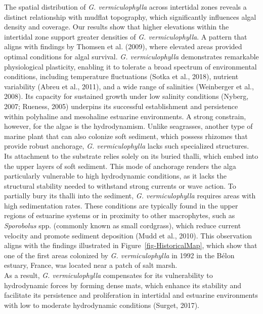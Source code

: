\documentclass[
  letterpaper,
  DIV=11,
  numbers=noendperiod]{scrartcl}
\begin{document}
The spatial distribution of \emph{G. vermiculophylla} across intertidal
zones reveals a distinct relationship with mudflat topography, which
significantly influences algal density and coverage. Our results show
that higher elevations within the intertidal zone support greater
densities of \emph{G. vermiculophylla}. A pattern that aligns with
findings by Thomsen et al. (2009), where elevated areas provided optimal
conditions for algal survival. \emph{G. vermiculophylla} demonstrates
remarkable physiological plasticity, enabling it to tolerate a broad
spectrum of environmental conditions, including temperature fluctuations
(Sotka et al., 2018), nutrient variability (Abreu et al., 2011), and a
wide range of salinities (Weinberger et al., 2008). Its capacity for
sustained growth under low salinity conditions (Nyberg, 2007; Rueness,
2005) underpins its successful establishment and persistence within
polyhaline and mesohaline estuarine environments. A strong constrain,
however, for the algae is the hydrodynamism. Unlike seagrasses, another
type of marine plant that can also colonize soft sediment, which possess
rhizomes that provide robust anchorage, \emph{G. vermiculophylla} lacks
such specialized structures. Its attachment to the substrate relies
solely on its buried thalli, which embed into the upper layers of soft
sediment. This mode of anchorage renders the alga particularly
vulnerable to high hydrodynamic conditions, as it lacks the structural
stability needed to withstand strong currents or wave action. To
partially bury its thalli into the sediment, \emph{G. vermiculophylla}
requires areas with high sedimentation rates. These conditions are
typically found in the upper regions of estuarine systems or in
proximity to other macrophytes, such as \emph{Sporobolus} spp. (commonly
known as small cordgrass), which reduce current velocity and promote
sediment deposition (Mudd et al., 2010). This observation aligns with
the findings illustrated in Figure~\ref{fig-HistoricalMap}, which show
that one of the first areas colonized by \emph{G. vermiculophylla} in
1992 in the Bélon estuary, France, was located near a patch of salt
marsh.\\
As a result, \emph{G. vermiculophylla} compensates for its vulnerability
to hydrodynamic forces by forming dense mats, which enhance its
stability and facilitate its persistence and proliferation in intertidal
and estuarine environments with low to moderate hydrodynamic conditions
(Surget, 2017).
\end{document}
